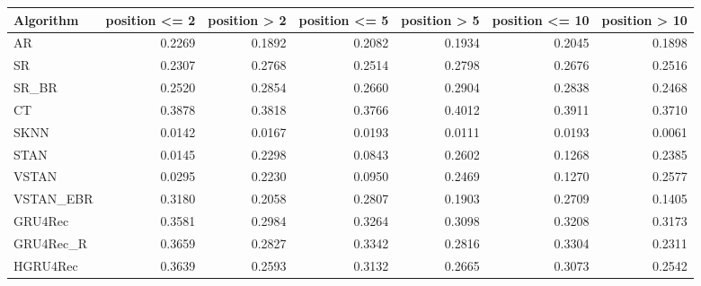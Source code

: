 \begin{tabular}{lrrrrrr}
\toprule
 Algorithm &  position <= 2 &  position > 2 &  position <= 5 &  position > 5 &  position <= 10 &  position > 10 \\
\midrule
        AR &         0.2269 &        0.1892 &         0.2082 &        0.1934 &          0.2045 &         0.1898 \\
        SR &         0.2307 &        0.2768 &         0.2514 &        0.2798 &          0.2676 &         0.2516 \\
     SR\_BR &         0.2520 &        0.2854 &         0.2660 &        0.2904 &          0.2838 &         0.2468 \\
        CT &         0.3878 &        0.3818 &         0.3766 &        0.4012 &          0.3911 &         0.3710 \\
      SKNN &         0.0142 &        0.0167 &         0.0193 &        0.0111 &          0.0193 &         0.0061 \\
      STAN &         0.0145 &        0.2298 &         0.0843 &        0.2602 &          0.1268 &         0.2385 \\
     VSTAN &         0.0295 &        0.2230 &         0.0950 &        0.2469 &          0.1270 &         0.2577 \\
 VSTAN\_EBR &         0.3180 &        0.2058 &         0.2807 &        0.1903 &          0.2709 &         0.1405 \\
   GRU4Rec &         0.3581 &        0.2984 &         0.3264 &        0.3098 &          0.3208 &         0.3173 \\
 GRU4Rec\_R &         0.3659 &        0.2827 &         0.3342 &        0.2816 &          0.3304 &         0.2311 \\
  HGRU4Rec &         0.3639 &        0.2593 &         0.3132 &        0.2665 &          0.3073 &         0.2542 \\
\bottomrule
\end{tabular}
